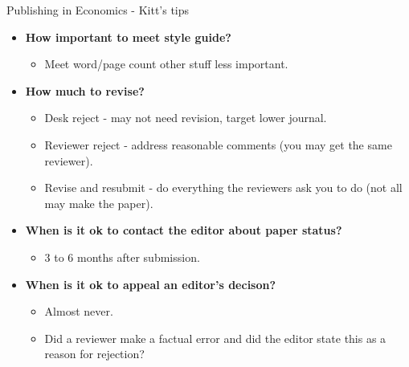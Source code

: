 \documentclass{beamer}
\begin{document}
\begin{frame}{Publishing in Economics - Kitt's tips}
    \begin{itemize}
        \item \textbf{How important to meet style guide?}
        \begin{itemize}
            \item Meet word/page count other stuff less important.
        \end{itemize}
        \smallskip
        \pause \item \textbf{How much to revise?}
        \begin{itemize}
            \item Desk reject - may not need revision, target lower journal.
            \item Reviewer reject - address reasonable comments (you may get the same reviewer).
            \item Revise and resubmit - do everything the reviewers ask you to do (not all may make the paper).
        \end{itemize}
        \smallskip
        \pause \item \textbf{When is it ok to contact the editor about paper status?}
        \begin{itemize}
            \item 3 to 6 months after submission.
        \end{itemize}
        \smallskip
        \pause \item \textbf{When is it ok to appeal an editor's decison?}
        \begin{itemize}
            \item Almost never.
            \item Did a reviewer make a factual error and did the editor state this as a reason for rejection?
        \end{itemize}
    \end{itemize}
\end{frame}
\end{document}

